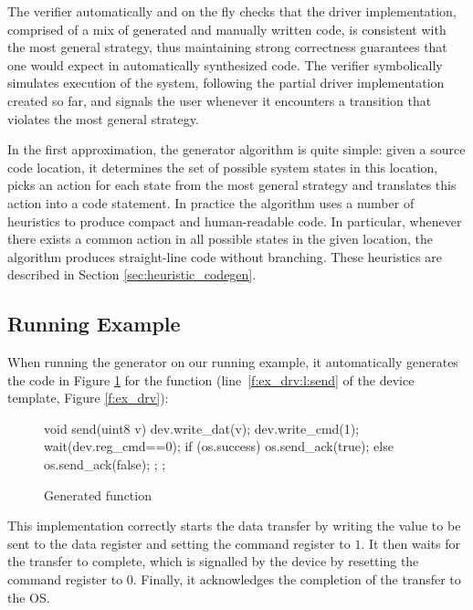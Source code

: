 The verifier automatically and on the fly checks that the driver implementation, comprised of a mix of generated and manually written code, is consistent with the most general strategy, thus maintaining strong correctness guarantees that one would expect in automatically synthesized code.  The verifier symbolically simulates execution of the system, following the partial driver implementation created so far, and signals the user whenever it encounters a transition that violates the most general strategy.

In the first approximation, the generator algorithm is quite simple: given a source code location, it determines the set of possible system states in this location, picks an action for each state from the most general strategy and translates this action into a code statement.  In practice the algorithm uses a number of heuristics to produce compact and human-readable code.  In particular, whenever there exists a common action in all possible states in the given location, the algorithm produces straight-line code without branching. These heuristics are described in Section \ref{sec:heuristic_codegen}.

\subsection{Running Example}

When running the generator on our running example, it automatically generates the code in Figure \ref{f:ex_gen_send} for the  function (line~\ref{f:ex_drv:l:send} of the device template, Figure \ref{f:ex_drv}):

\begin{figure}
\begin{tsllisting}
void send(uint8 v){
    dev.write_dat(v);
    dev.write_cmd(1);
    wait(dev.reg_cmd==0);
    if (os.success) {
        os.send_ack(true);
    } else {
        os.send_ack(false);
    };
};
\end{tsllisting}
\caption{Generated  function}
\label{f:ex_gen_send}
\end{figure}

This implementation correctly starts the data transfer by writing the value to be sent to the data register and setting the command register to $1$.  It then waits for the transfer to complete, which is signalled by the device by resetting the command register to $0$.  Finally, it acknowledges the completion of the transfer to the OS.

